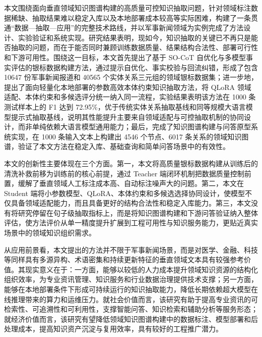 
\begin{conclusion}

本文围绕面向垂直领域知识图谱构建的高质量可控知识抽取问题，针对领域标注数据稀缺、抽取结果难以稳定入库以及本地部署成本较高等实际困难，构建了一条贯通“数据—抽取—应用”的完整技术路线，并以军事新闻领域为实例完成了方法设计、实验验证和系统实现。研究结果表明，现如今，知识抽取的关键已不再只是能否抽取的问题，而在于能否同时兼顾训练数据质量、结果结构合法性、部署可行性和下游可用性。围绕这一目标，本文首先提出了基于 SO-CoT 自优化与多模型事实评估的银标数据构建方法，通过提示自优化、事实校验与回流纠错，形成了包含 10647 份军事新闻报道和 40565 个实体关系三元组的领域银标数据集；进一步地，提出了面向轻量化本地部署的参数高效本体约束知识抽取方法，将 QLoRA 领域适配、本体约束和多候选评分统一纳入同一流程，实验结果表明该方法在 1000 条测试样本上的 F1 达到 72.95\%，优于传统实体关系抽取基线和同等规模大语言模型提示式抽取基线，说明其性能提升主要来自领域适配与可控抽取机制的协同设计，而非单纯依赖大语言模型通用能力；最后，完成了知识图谱构建与问答原型系统实现，在 1000 条输入文本上构建出 4546 个节点、6017 条关系的领域知识图谱，验证了本文方法在稳定入库、基础查询和简单问答场景中的有效性。

本文的创新性主要体现在三个方面。第一，本文将高质量银标数据构建从训练后的清洗补救前移为训练前的核心前提，通过 Teacher 端闭环机制把数据质量控制前置，缓解了垂直领域人工标注成本高、自动标注噪声大的问题。第二，本文在 Student 端将小参数模型、QLoRA、本体约束和多候选选择协同设计，使模型不仅具备领域适配能力，而且具备更好的结构合法性和稳定入库能力。第三，本文没有将研究停留在句子级抽取指标上，而是将知识图谱构建和下游问答验证纳入整体评估，使方法评价从单一精度提升扩展到工程可用性与知识服务能力，更贴近真实场景中的领域知识组织需求。

从应用前景看，本文提出的方法并不限于军事新闻场景，而是对医学、金融、科技等同样具有多源异构、术语密集和持续更新特征的垂直领域文本具有较强参考价值。其现实意义在于：一方面，能够以较低的人力成本提升领域知识资源的结构化组织效率，为专业资讯管理、知识服务和行业数据治理提供技术支撑；另一方面，能够在本地部署条件下形成可持续运行的知识抽取能力，降低长期依赖超大模型在线推理带来的算力和运维压力。就社会价值而言，该研究有助于提高专业资讯的可检索性、可追溯性和可利用性，支撑智能问答、知识检索和辅助分析等服务形态；就经济价值而言，该研究有望降低领域知识图谱构建中的数据标注、模型部署和后处理成本，提高知识资产沉淀与复用效率，具有较好的工程推广潜力。


\end{conclusion}
